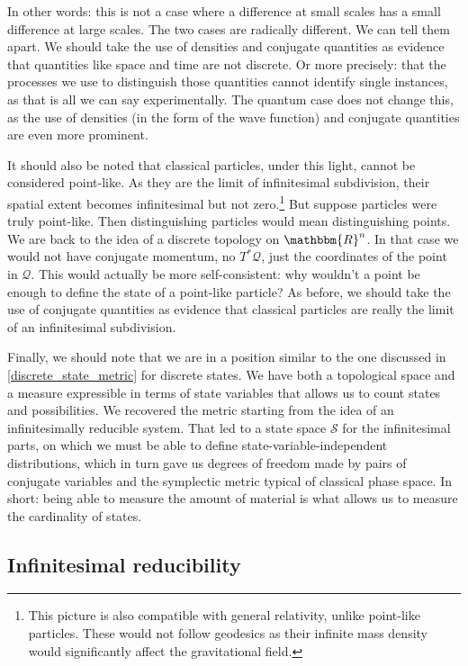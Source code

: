\documentclass[aps,pra,10pt,twocolumn,floatfix,nofootinbib]{revtex4-1}
\numberwithin{equation}{section}
\theoremstyle{definition}
\begin{document}
In other words: this is not a case where a difference at  small scales has a small difference at large scales. The two cases are radically different. We can tell them apart. We should take the use of densities and conjugate quantities as evidence that quantities like space and time are not discrete. Or more precisely: that the processes we use to distinguish those quantities cannot identify single instances, as that is all we can say experimentally. The quantum case does not change this, as the use of densities (in the form of the wave function) and conjugate quantities are even more prominent.

It should also be noted that classical particles, under this light, cannot be considered point-like. As they are the limit of infinitesimal subdivision, their spatial extent becomes infinitesimal but not zero.\footnote{This picture is also compatible with general relativity, unlike point-like particles. These would not follow geodesics as their infinite mass density would significantly affect the gravitational field.} But suppose particles were truly point-like. Then distinguishing particles would mean distinguishing points. We are back to the idea of a discrete topology on $\mathbbm{R}^n$. In that case we would not have conjugate momentum, no $T^*\mathcal{Q}$, just the coordinates of the point in $\mathcal{Q}$. This would actually be more self-consistent: why wouldn't a point be enough to define the state of a point-like particle? As before, we should take the use of conjugate quantities as evidence that classical particles are really the limit of an infinitesimal subdivision.

Finally, we should note that we are in a position similar to the one discussed in \ref{discrete_state_metric} for discrete states. We have both a topological space and a measure expressible in terms of state variables that allows us to count states and possibilities. We recovered the metric starting from the idea of an infinitesimally reducible system. That led to a state space $\mathcal{S}$ for the infinitesimal parts, on which we must be able to define state-variable-independent distributions, which in turn gave us degrees of freedom made by pairs of conjugate variables and the symplectic metric typical of classical phase space. In short: being able to measure the amount of material is what allows us to measure the cardinality of states.


\subsection{Infinitesimal reducibility}
\end{document}

